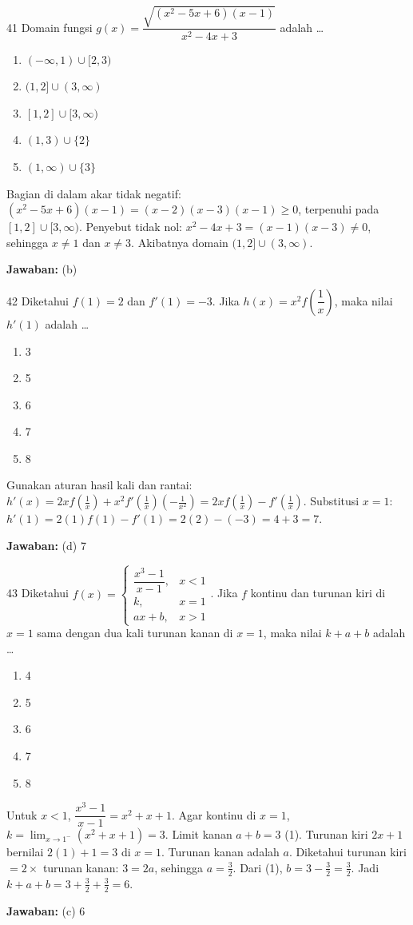 \documentclass[11pt]{article}
\newenvironment{pil}{\begin{enumerate}[label=(\alph*),leftmargin=*,itemsep=1pt,topsep=3pt]}{\end{enumerate}}
\newcommand{\jw}[1]{\par\smallskip\noindent\textbf{Jawaban:} #1}
\begin{document}
\begin{soalbox}{41}
Domain fungsi $g(x)=\dfrac{\sqrt{(x^2-5x+6)(x-1)}}{x^2-4x+3}$ adalah \ldots
\begin{pil}\item $(-\infty,1)\cup[2,3)$ \item $(1,2]\cup(3,\infty)$ \item $[1,2]\cup[3,\infty)$ \item $(1,3)\cup\{2\}$ \item $(1,\infty)\cup\{3\}$\end{pil}
\end{soalbox}
\begin{pembox}
Bagian di dalam akar tidak negatif: $(x^2-5x+6)(x-1)=(x-2)(x-3)(x-1)\geq0$, terpenuhi pada $[1,2]\cup[3,\infty)$. Penyebut tidak nol: $x^2-4x+3=(x-1)(x-3)\neq0$, sehingga $x\neq1$ dan $x\neq3$. Akibatnya domain $(1,2]\cup(3,\infty)$.
\jw{(b)}
\end{pembox}

\begin{soalbox}{42}
Diketahui $f(1)=2$ dan $f'(1)=-3$. Jika $h(x)=x^2 f\left(\dfrac{1}{x}\right)$, maka nilai $h'(1)$ adalah \ldots
\begin{pil}\item 3 \item 5 \item 6 \item 7 \item 8\end{pil}
\end{soalbox}
\begin{pembox}
Gunakan aturan hasil kali dan rantai: $h'(x)=2xf\left(\tfrac{1}{x}\right)+x^2 f'\left(\tfrac{1}{x}\right)\left(-\tfrac{1}{x^2}\right)=2xf\left(\tfrac{1}{x}\right)-f'\left(\tfrac{1}{x}\right)$. Substitusi $x=1$: $h'(1)=2(1)f(1)-f'(1)=2(2)-(-3)=4+3=7$.
\jw{(d) 7}
\end{pembox}

\begin{soalbox}{43}
Diketahui $f(x)=\begin{cases}\dfrac{x^3-1}{x-1}, & x<1\\ k, & x=1\\ ax+b, & x>1\end{cases}$. Jika $f$ kontinu dan turunan kiri di $x=1$ sama dengan dua kali turunan kanan di $x=1$, maka nilai $k+a+b$ adalah \ldots
\begin{pil}\item 4 \item 5 \item 6 \item 7 \item 8\end{pil}
\end{soalbox}
\begin{pembox}
Untuk $x<1$, $\dfrac{x^3-1}{x-1}=x^2+x+1$. Agar kontinu di $x=1$, $k=\lim_{x\to1^-}(x^2+x+1)=3$. Limit kanan $a+b=3$ \;(1). Turunan kiri $2x+1$ bernilai $2(1)+1=3$ di $x=1$. Turunan kanan adalah $a$. Diketahui turunan kiri $=2\times$ turunan kanan: $3=2a$, sehingga $a=\tfrac{3}{2}$. Dari (1), $b=3-\tfrac{3}{2}=\tfrac{3}{2}$. Jadi $k+a+b=3+\tfrac{3}{2}+\tfrac{3}{2}=6$.
\jw{(c) 6}
\end{pembox}
\end{document}

